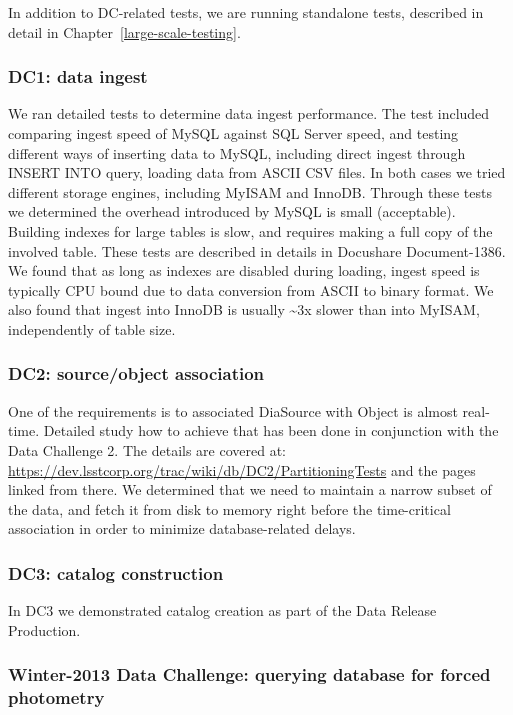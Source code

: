 \documentclass[DM,lsstdraft,toc]{lsstdoc}
\begin{document}
In addition to DC-related tests, we are running standalone tests,
described in detail in Chapter~\ref{large-scale-testing}.

\subsubsection{DC1: data ingest}\label{dc1-data-ingest}

We ran detailed tests to determine data ingest performance. The test
included comparing ingest speed of MySQL against SQL Server speed, and
testing different ways of inserting data to MySQL, including direct
ingest through INSERT INTO query, loading data from ASCII CSV files. In
both cases we tried different storage engines, including MyISAM and
InnoDB. Through these tests we determined the overhead introduced by
MySQL is small (acceptable). Building indexes for large tables is slow,
and requires making a full copy of the involved table. These tests are
described in details in Docushare Document-1386. We found that as long
as indexes are disabled during loading, ingest speed is typically CPU
bound due to data conversion from ASCII to binary format. We also found
that ingest into InnoDB is usually \textasciitilde{}3x slower than into
MyISAM, independently of table size.

\subsubsection{DC2: source/object
association}\label{dc2-sourceobject-association}

One of the requirements is to associated DiaSource with Object is almost
real-time. Detailed study how to achieve that has been done in
conjunction with the Data Challenge 2. The details are covered at:
\url{https://dev.lsstcorp.org/trac/wiki/db/DC2/PartitioningTests} and
the pages linked from there. We determined that we need to maintain a
narrow subset of the data, and fetch it from disk to memory right before
the time-critical association in order to minimize database-related
delays.

\subsubsection{DC3: catalog
construction}\label{dc3-catalog-construction}

In DC3 we demonstrated catalog creation as part of the Data Release
Production.

\subsubsection{Winter-2013 Data Challenge: querying database for forced
photometry}\label{winter-2013-data-challenge-querying-database-for-forced-photometry}
\end{document}
